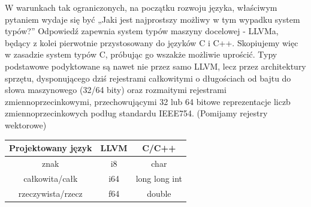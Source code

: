 W warunkach tak ograniczonych, na początku rozwoju języka, właściwym pytaniem wydaje się być „Jaki jest najprostszy możliwy w tym wypadku system typów?” Odpowiedź zapewnia system typów maszyny docelowej - LLVMa, będący z kolei pierwotnie przystosowany do języków C i C++. Skopiujemy więc w zasadzie system typów C, próbując go wszakże możliwie uprościć.
Typy podstawowe podyktowane są nawet nie przez samo LLVM, lecz przez architektury sprzętu, dysponującego dziś rejestrami całkowitymi o długościach od bajtu do słowa maszynowego (32/64 bity) oraz rozmaitymi rejestrami zmiennoprzecinkowymi, przechowującymi 32 lub 64 bitowe  reprezentacje liczb zmiennoprzecinkowych podług standardu IEEE754. (Pomijamy rejestry wektorowe)
\begin{center}
\begin{tabular}{|c|c|c|}
\hline
\textbf{Projektowany język} & \textbf{LLVM} & \textbf{C/C++} \\ \hline
znak                        & i8       & char               \\ \hline
całkowita/całk              & i64      & long long int      \\ \hline
rzeczywista/rzecz           & f64      & double             \\ \hline
\end{tabular}
\end{center}

